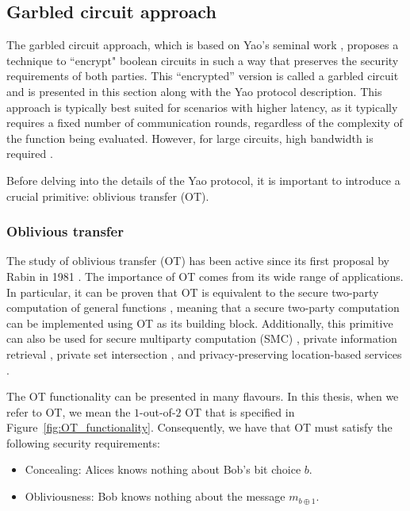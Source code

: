 \subsection{Garbled circuit approach}

The garbled circuit approach, which is based on Yao's seminal work \cite{Yao82}, proposes a technique to ``encrypt" boolean circuits in such a way that preserves the security requirements of both parties. This ``encrypted'' version is called a garbled circuit and is presented in this section along with the Yao protocol description. This approach is typically best suited for scenarios with higher latency, as it typically requires a fixed number of communication rounds, regardless of the complexity of the function being evaluated. However, for large circuits, high bandwidth is required \cite{PWM+20}.

Before delving into the details of the Yao protocol, it is important to introduce a crucial primitive: oblivious transfer (OT).

\subsubsection{Oblivious transfer}

The study of oblivious transfer (OT) has been active since its first proposal by Rabin in 1981 \cite{Rabin81}. The importance of OT comes from its wide range of applications. In particular, it can be proven that OT is equivalent to the secure two-party computation of general functions \cite{Y86, K88}, meaning that a secure two-party computation can be implemented using OT as its building block. Additionally, this primitive can also be used for secure multiparty computation (SMC) \cite{KOS16}, private information retrieval \cite{Che04}, private set intersection \cite{MEP17}, and privacy-preserving location-based services \cite{BHM+19}.

The OT functionality can be presented in many flavours. In this thesis, when we refer to OT, we mean the $1$-out-of-$2$ OT that is specified in Figure~\ref{fig:OT_functionality}. Consequently, we have that OT must satisfy the following security requirements:

\begin{itemize}
	\item Concealing: Alices knows nothing about Bob's bit choice $b$.
	\item Obliviousness: Bob knows nothing about the message $m_{b\oplus 1}$.
\end{itemize}

